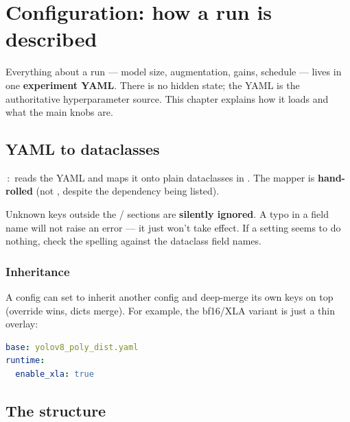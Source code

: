 \chapter{Configuration: how a run is described}

Everything about a run --- model size, augmentation, gains, schedule --- lives in one
\textbf{experiment YAML}. There is no hidden state; the YAML is the authoritative
hyperparameter source. This chapter explains how it loads and what the main knobs are.

\section{YAML to dataclasses}
\,:\, reads the YAML and maps it onto
plain dataclasses in . The mapper is \textbf{hand-rolled}
(not , despite the dependency being listed).

\begin{pitfall}
Unknown keys outside the / sections are \textbf{silently
ignored}. A typo in a field name will not raise an error --- it just won't take effect. If
a setting seems to do nothing, check the spelling against the dataclass field names.
\end{pitfall}

\subsection{Inheritance}
A config can set  to inherit another config and deep-merge its own keys
on top (override wins, dicts merge). For example, the bf16/XLA variant is just a thin
overlay:

\begin{lstlisting}[language=yaml]
base: yolov8_poly_dist.yaml
runtime:
  enable_xla: true
\end{lstlisting}

\section{The structure}
\begin{center}
\end{center}

